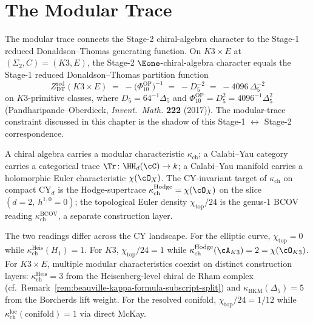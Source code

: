 \chapter{The Modular Trace}
\label{ch:modular-trace}

\begin{remark}
\label{rem:modular-trace-stage1-stage2-bridge}
The modular trace connects the Stage-2 chiral-algebra character to the Stage-1 reduced Donaldson--Thomas generating function. On $K3\times E$ at $(\Sigma_2, C) = (K3, E)$, the Stage-2 $\Eone$-chiral-algebra character equals the Stage-1 reduced Donaldson--Thomas partition function
\[
 Z^{\mathrm{red}}_{\mathrm{DT}}(K3\times E)
 \;=\; -\bigl(\Phi_{10}^{\mathrm{OP}}\bigr)^{-1}
 \;=\;-D_5^{-2}
 \;=\;-4096\,\Delta_5^{-2}
\]
on $K3$-primitive classes, where \(D_5=64^{-1}\Delta_5\) and
\(\Phi_{10}^{\mathrm{OP}}=D_5^2=4096^{-1}\Delta_5^2\)
(Pandharipande--Oberdieck, \emph{Invent.\ Math.} \textbf{222} (2017)).
The modular-trace constraint discussed in this chapter is the shadow of
this Stage-1 $\leftrightarrow$ Stage-2 correspondence.
\end{remark}

A chiral algebra carries a modular characteristic $\kappa_{\mathrm{ch}}$; a Calabi--Yau category carries a categorical trace $\Tr \colon \HH_d(\cC) \to k$; a Calabi--Yau manifold carries a holomorphic Euler characteristic $\chi(\cO_X)$. The CY-invariant target of $\kappa_{\mathrm{ch}}$ on compact CY$_d$ is the Hodge-supertrace $\kappa_{\mathrm{ch}}^{\mathrm{Hodge}} = \chi(\cO_X)$ on the slice $(d = 2,\ h^{1, 0} = 0)$; the topological Euler density $\chi_{\mathrm{top}}/24$ is the genus-$1$ BCOV reading $\kappa_{\mathrm{ch}}^{\mathrm{BCOV}}$, a separate construction layer.

The two readings differ across the CY landscape. For the elliptic curve, $\chi_{\mathrm{top}} = 0$ while $\kappa_{\mathrm{ch}}^{\mathrm{Heis}}(H_1) = 1$. For $K3$, $\chi_{\mathrm{top}}/24 = 1$ while $\kappa_{\mathrm{ch}}^{\mathrm{Hodge}}(\cA_{K3}) = 2 = \chi(\cO_{K3})$. For $K3 \times E$, multiple modular characteristics coexist on distinct construction layers: $\kappa_{\mathrm{ch}}^{\mathrm{Heis}} = 3$ from the Heisenberg-level chiral de Rham complex (cf.\ Remark~\ref{rem:beauville-kappa-formula-subscript-split}) and $\kappa_{\mathrm{BKM}}(\Delta_5) = 5$ from the Borcherds lift weight. For the resolved conifold, $\chi_{\mathrm{top}}/24 = 1/12$ while $\kappa_{\mathrm{ch}}^{\mathrm{loc}}(\mathrm{conifold}) = 1$ via direct McKay.

